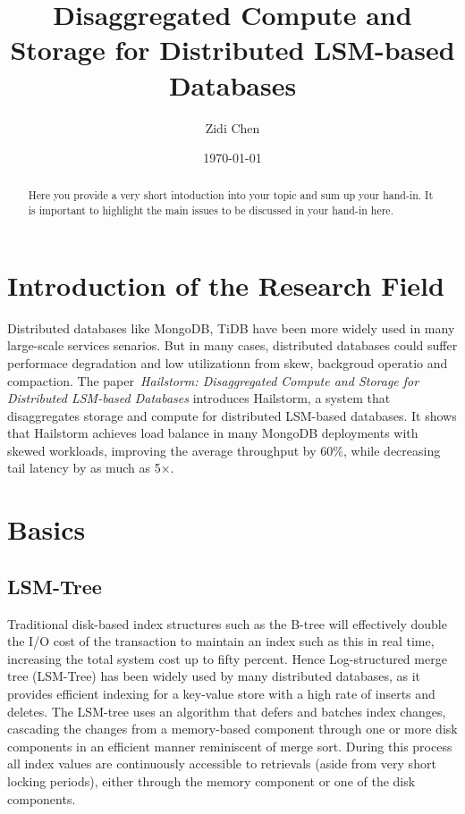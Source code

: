 \documentclass[a4paper,10pt,twoside]{article}
\title{Disaggregated Compute and Storage for Distributed LSM-based Databases}
\author{Zidi Chen}
\date{\today}
\begin{document}
\maketitle

\begin{abstract}
Here you provide a very short intoduction into your topic and sum up your hand-in. 
It is important to highlight the main issues to be discussed in your hand-in here.
\end{abstract}

\tableofcontents

\section{Introduction of the Research Field}

Distributed databases like MongoDB, TiDB have been more widely used in many large-scale services senarios.
But in many cases, distributed databases could suffer performace degradation and low utilizationn from skew, backgroud operatio and compaction.
The paper~\textit{Hailstorm: Disaggregated Compute and Storage for Distributed LSM-based Databases} \cite{mainpaper}introduces Hailstorm, a system that disaggregates storage and compute for distributed LSM-based databases.
It shows that Hailstorm achieves load balance in many MongoDB deployments with skewed workloads, improving the average throughput by 60$\%$, while decreasing tail latency by as much as 5×.


\section{Basics}

\subsection{LSM-Tree}

Traditional disk-based index structures such as the B-tree will effectively double the I/O cost of the transaction to maintain an index such as this in real time, increasing the total system cost up to fifty percent. 
Hence Log-structured merge tree (LSM-Tree) \cite{LSM-tree} has been widely used by many distributed databases, as it provides efficient indexing for a key-value store with a high rate of inserts and deletes.
The LSM-tree uses an algorithm that defers and batches index changes, cascading the changes from a memory-based component through one or more disk components in an efficient manner reminiscent of merge sort. 
During this process all index values are continuously accessible to retrievals (aside from very short locking periods), either through the memory component or one of the disk components.
\end{document}
